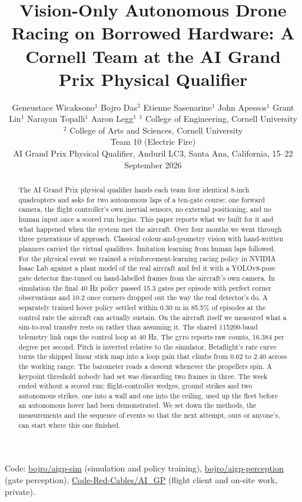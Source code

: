 \documentclass{article}
\title{Vision-Only Autonomous Drone Racing on Borrowed Hardware: A Cornell Team at the AI Grand Prix Physical Qualifier}
\author{Geneustace Wicaksono$^{1}$ \And Bojro Das$^{2}$ \And Etienne Sasenarine$^{1}$ \And John Apessos$^{1}$ \AND Grant Lin$^{1}$ \And Narayan Topalli$^{1}$ \And Aaron Legg$^{1}$ \AND \normalfont $^{1}$ College of Engineering, Cornell University \\ $^{2}$ College of Arts and Sciences, Cornell University \\[4pt] Team 10 (Electric Fire) \\ AI Grand Prix Physical Qualifier, Anduril LC3, Santa Ana, California, 15--22 September 2026}
\begin{document}
\maketitle
\begin{abstract}
The AI Grand Prix physical qualifier hands each team four identical 8-inch quadcopters and asks for two autonomous laps of a ten-gate course: one forward camera, the flight controller's own inertial sensors, no external positioning, and no human input once a scored run begins. This paper reports what we built for it and what happened when the system met the aircraft. Over four months we went through three generations of approach. Classical colour-and-geometry vision with hand-written planners carried the virtual qualifiers. Imitation learning from human laps followed. For the physical event we trained a reinforcement-learning racing policy in NVIDIA Isaac Lab against a plant model of the real aircraft and fed it with a YOLOv8-pose gate detector fine-tuned on hand-labelled frames from the aircraft's own camera. In simulation the final 40 Hz policy passed 15.3 gates per episode with perfect corner observations and 10.2 once corners dropped out the way the real detector's do. A separately trained hover policy settled within 0.30 m in 85.5\% of episodes at the control rate the aircraft can actually sustain. On the aircraft itself we measured what a sim-to-real transfer rests on rather than assuming it. The shared 115200-baud telemetry link caps the control loop at 40 Hz. The gyro reports raw counts, 16.384 per degree per second. Pitch is inverted relative to the simulator. Betaflight's rate curve turns the shipped linear stick map into a loop gain that climbs from 0.62 to 2.40 across the working range. The barometer reads a descent whenever the propellers spin. A keypoint threshold nobody had set was discarding two frames in three. The week ended without a scored run: flight-controller wedges, ground strikes and two autonomous strikes, one into a wall and one into the ceiling, used up the fleet before an autonomous hover had been demonstrated. We set down the methods, the measurements and the sequence of events so that the next attempt, ours or anyone's, can start where this one finished.
\end{abstract}
\begin{center}\small Code: \href{https://github.com/bojro/aigp-sim}{bojro/aigp-sim} (simulation and policy training), \href{https://github.com/bojro/aigp-perception}{bojro/aigp-perception} (gate perception), \href{https://github.com/Code-Red-Cables/AI_GP}{Code-Red-Cables/AI\_GP} (flight client and on-site work, private).\end{center}
\end{document}
